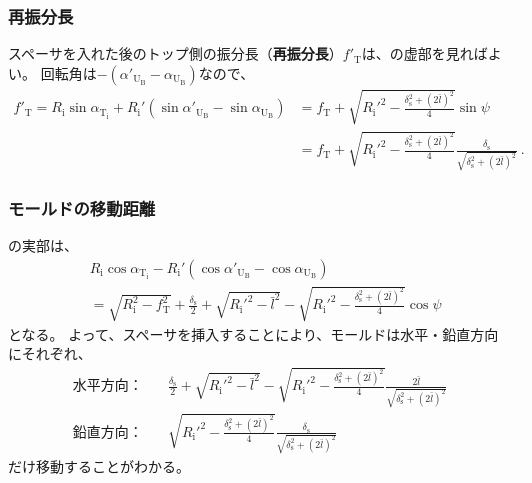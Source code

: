 \subsubsection{再振分長}
スペーサを入れた後のトップ側の振分長（\textbf{再振分長}）$f'_\mathrm T$は、の虚部を見ればよい。
回転角は$-(\alpha'_{\mathrm U_\mathrm B}-\alpha_{\mathrm U_\mathrm B})$なので、
\begin{align*}
  f'_\mathrm T
  = R_\mathrm i\sin\alpha_{\mathrm T_\mathrm i}
    +R_\mathrm i'\left(\sin\alpha'_{\mathrm U_\mathrm B}-\sin\alpha_{\mathrm U_\mathrm B}\right)
  &= f_\mathrm T+\sqrt{R_\mathrm i'^2-\frac{\delta_\mathrm s^2+(2\bar l)^2}4}\sin\psi\\
  &= f_\mathrm T+\sqrt{R_\mathrm i'^2-\frac{\delta_\mathrm s^2+(2\bar l)^2}4}\frac{\delta_\mathrm s}{\sqrt{\delta_\mathrm s^2+(2\bar l)^2}}\ .
\end{align*}


\subsubsection{モールドの移動距離}
の実部は、
\begin{align*}
  & R_\mathrm i\cos\alpha_{\mathrm T_\mathrm i}
    -R_\mathrm i'(\cos\alpha'_{\mathrm U_\mathrm B}-\cos\alpha_{\mathrm U_\mathrm B})\\
  & = \sqrt{R_\mathrm i^2-f_\mathrm T^2}+\frac{\delta_\mathrm s}2+\sqrt{R_\mathrm i'^2-\bar l^2}
      -\sqrt{R_\mathrm i'^2-\frac{\delta_\mathrm s^2+(2\bar l)^2}4}\cos\psi
\end{align*}
となる。
よって、スペーサを挿入することにより、モールドは水平・鉛直方向にそれぞれ、
\begin{subequations}
\begin{alignat}{2}
  \label{eq:spacerMoveHdistance}
  \text{水平方向：}\quad
  & \frac{\delta_\mathrm s}2+\sqrt{R_\mathrm i'^2-\bar l^2}-\sqrt{R_\mathrm i'^2-\frac{\delta_\mathrm s^2+(2\bar l)^2}4}\frac{2\bar l}{\sqrt{\delta_\mathrm s^2+(2\bar l)^2}}\\
  \text{鉛直方向：}\quad
  & \sqrt{R_\mathrm i'^2-\frac{\delta_\mathrm s^2+(2\bar l)^2}4}\frac{\delta_\mathrm s}{\sqrt{\delta_\mathrm s^2+(2\bar l)^2}}
\end{alignat}
\end{subequations}
だけ移動することがわかる。



